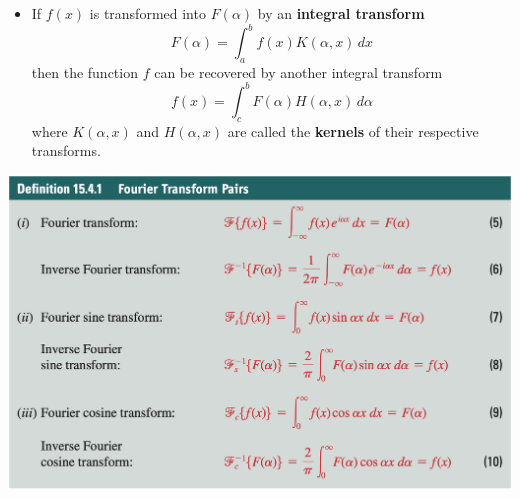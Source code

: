 \documentclass{article}
\begin{document}
\begin{itemize}
  \item If $f(x)$ is transformed into $F(\alpha)$ by an \textbf{integral transform} \[F(\alpha) = \int_a^b f(x) K(\alpha, x) \,d x\] then the function $f$ can be recovered by another integral transform \[f(x) = \int_c^b F(\alpha) H(\alpha, x) \,d \alpha\] where $K(\alpha, x)$ and $H(\alpha, x)$ are called the \textbf{kernels} of their respective transforms.
\end{itemize}

\includegraphics[scale=0.45]{fourier-transforms}
\end{document}
